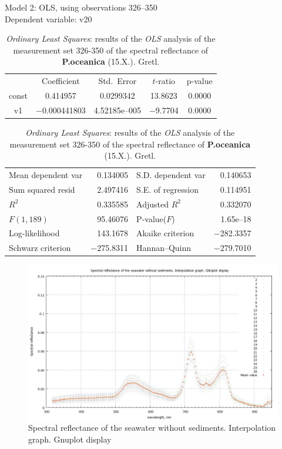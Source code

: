 \documentclass[10pt, a4paper]{article}
\begin{document}
\begin{appendices}
\begin{table}
\begin{center}
\caption{\textit{Ordinary Least Squares}: results of the \textit{OLS} analysis of the measurement set 326-350 of the spectral reflectance of \textbf{P.oceanica} (15.X.). Gretl.}
Model 2: OLS, using observations 326--350\\
Dependent variable: v20 \\
\vspace{1em}
\begin{tabular}{|c c c c c|}
  & {Coefficient} &  {Std.\ Error} &   {$t$-ratio} &    {p-value} \\[1ex]
const &  0.414957 &    0.0299342 &      13.8623 &        0.0000 \\
v1 &   $-$0.000441803 &     4.52185\textrm{e--005} &       $-$9.7704 &         0.0000 \\ \hline\hline
\end{tabular}
\vspace{1ex}
\begin{tabular}{lrlr}
Mean dependent var &  0.134005 & S.D. dependent var &  0.140653 \\
Sum squared resid &  2.497416 & S.E. of regression &  0.114951 \\
$R^2$ &  0.335585 & Adjusted $R^2$ &  0.332070 \\
$F(1, 189)$ &  95.46076 & P-value($F$) &  1.65\textrm{e--18} \\
Log-likelihood &  143.1678 & Akaike criterion & $-$282.3357 \\
Schwarz criterion & $-$275.8311 & Hannan--Quinn & $-$279.7010 \\
\end{tabular}
\end{center}
\end{table}
\pagebreak

\begin{figure}[h]
\begin{center}
\includegraphics[scale=0.22]{GNU-10.jpg}
\caption{Spectral reflectance of the seawater without sediments. Interpolation graph. Gnuplot display­}
\label{fig:53}
\end{center}
\end{figure}


\end{appendices}
\end{document}
